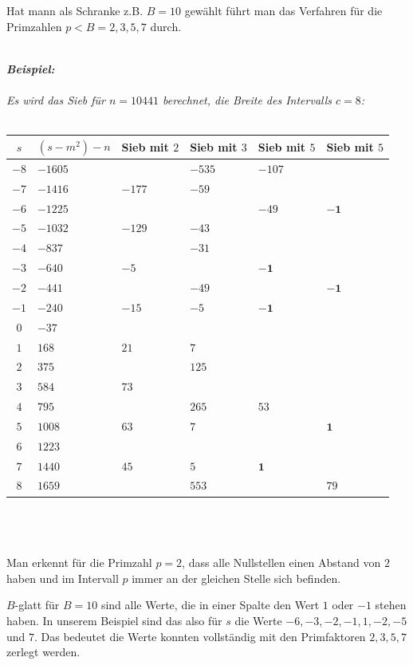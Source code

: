 \documentclass[10pt, bigheadings]{scrartcl}
\begin{document}
Hat mann als Schranke z.B. $B=10$ gewählt führt man das Verfahren
für die Primzahlen $p<B = 2, 3, 5, 7$ durch.\\\\
{\it
\textbf{Beispiel:}\\\\
Es wird das Sieb für $n=10441$ berechnet, die Breite des Intervalls $c=8$:\\\\
\begin{tabular}{|c|l|l|l|l|l|}
\hline
$s$ & $(s-m^2)-n$ & Sieb mit $2$ &  Sieb mit $3$ &  Sieb mit $5$ & Sieb mit $5$\\
\hline
$-8$ & $-1605$& & $-535$& $-107$& \\
\hline
$-7$ & $-1416$& $-177$& $-59$ & & \\
\hline
$-6$ & $-1225$& & &$ -49$& $\mathbf{-1}$\\
\hline
$-5$ & $-1032$& $-129$& $-43$& & \\
\hline
$-4$ &$-837$ & &$-31$ & & \\
\hline
$-3$ & $-640$&$-5$ & &$\mathbf{-1}$ & \\
\hline
$-2$ &$ -441$& &$ -49$& &$\mathbf{-1}$ \\
\hline
$-1$ &$ -240$& $-15$& $-5$ &$ \mathbf{-1}$ & \\
\hline
$0$ & $-37$& & & & \\
\hline
$1$ &$ 168$& $21$& $7$& & \\
\hline
$2$ & $375$& &$125$ & & \\
\hline
$3$ & $584$&$73$ & & & \\
\hline
$4$ & $795$& & $265$& $53$& \\
\hline
$5$ & $1008$& $63$& $7$& &$\mathbf{1}$ \\
\hline
$6$ & $1223$& & & & \\
\hline
$7$ & $1440$ & $45$ & $5$ & $\mathbf{1}$ & \\
\hline
$8$ & $1659$ & & $553$ & & $79$ \\
\hline
\end{tabular}\\\\\\
Man erkennt für die Primzahl $p=2$, dass alle Nullstellen einen Abstand
von $2$ haben und im Intervall $p$ immer an der gleichen Stelle sich
befinden.
}

$B$-glatt für $B=10$ sind alle Werte, die in einer Spalte den Wert
$1$ oder $-1$ stehen haben. In unserem Beispiel sind das also für
$s$ die Werte $-6,-3,-2,-1,1,-2,-5$ und $7$. Das bedeutet die Werte
konnten vollständig mit den Primfaktoren $2,3,5,7$ zerlegt werden.
\end{document}
